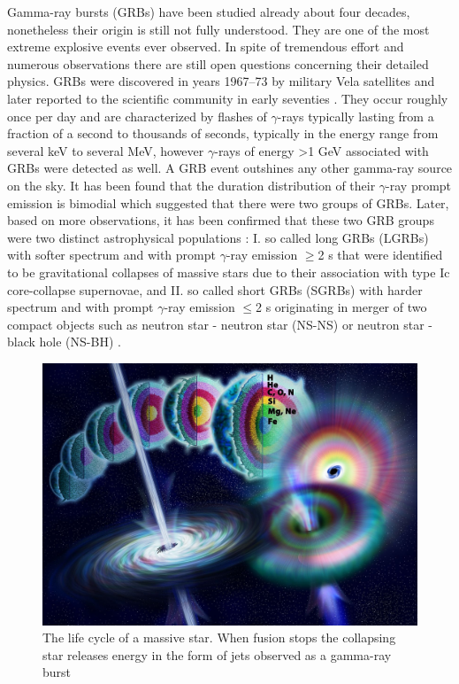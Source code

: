\documentclass[12pt, a4paper,titlepage]{article}
\numberwithin{equation}{section}
\numberwithin{figure}{section}
\begin{document}
Gamma-ray bursts (GRBs) \cite{grb1,grb2,grb3,grb4} have been studied already about four decades, nonetheless their origin is still not fully understood. They are one of the most extreme explosive events ever observed. In spite of tremendous effort and numerous observations there are still open questions concerning their detailed physics. GRBs were discovered in years 1967–73 by military Vela satellites and later reported to the scientific community in early seventies \cite{grb5}. They occur roughly once per day and are characterized by flashes of $\gamma$-rays typically lasting from a fraction of a second to thousands of seconds, typically in the energy range from several keV to several MeV, however $\gamma$-rays of energy >1 GeV associated with GRBs were detected as well. A GRB event outshines any other gamma-ray source on the sky.
It has been found that the duration distribution of their $\gamma$-ray prompt emission is bimodial \cite{grb6} which suggested that there were two groups of GRBs. Later, based on more observations, it has been confirmed that these two GRB groups were two distinct astrophysical populations \cite{grb6,grb7,grb8}: I. so called long GRBs (LGRBs) with softer spectrum and with prompt $\gamma$-ray emission $\geqslant$2 s that were identified to be gravitational collapses of massive stars due to their association with type Ic core-collapse supernovae, and II. so called short GRBs (SGRBs) with harder spectrum and with prompt $\gamma$-ray emission $\leqslant$2 s originating in merger of two compact objects such as neutron star - neutron star (NS-NS) or neutron star - black hole (NS-BH) \cite{grb9}.


\begin{figure}[H]
\centering
\includegraphics[width=130.0mm]{images/Gamma_ray_burst.jpg}
\caption{The life cycle of a massive star. When fusion stops the collapsing star releases energy in the form of jets observed as a gamma-ray burst}
\end{figure}
\end{document}
